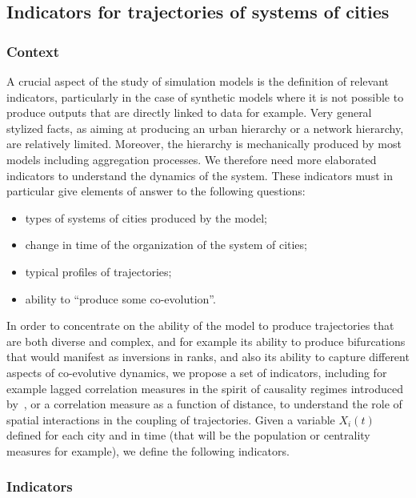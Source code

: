 


\subsection{Indicators for trajectories of systems of cities}

\subsubsection{Context}

A crucial aspect of the study of simulation models is the definition of relevant indicators, particularly in the case of synthetic models where it is not possible to produce outputs that are directly linked to data for example. Very general stylized facts, as aiming at producing an urban hierarchy or a network hierarchy, are relatively limited. Moreover, the hierarchy is mechanically produced by most models including aggregation processes. We therefore need more elaborated indicators to understand the dynamics of the system. These indicators must in particular give elements of answer to the following questions:
\begin{itemize}
	\item types of systems of cities produced by the model;
	\item change in time of the organization of the system of cities;
	\item typical profiles of trajectories;
	\item ability to ``produce some co-evolution''.
\end{itemize}


In order to concentrate on the ability of the model to produce trajectories that are both diverse and complex, and for example its ability to produce bifurcations that would manifest as inversions in ranks, and also its ability to capture different aspects of co-evolutive dynamics, we propose a set of indicators, including for example lagged correlation measures in the spirit of causality regimes introduced by~\cite{raimbault2017identification}, or a correlation measure as a function of distance, to understand the role of spatial interactions in the coupling of trajectories. Given a variable $X_i(t)$ defined for each city and in time (that will be the population or centrality measures for example), we define the following indicators.

\subsubsection{Indicators}

